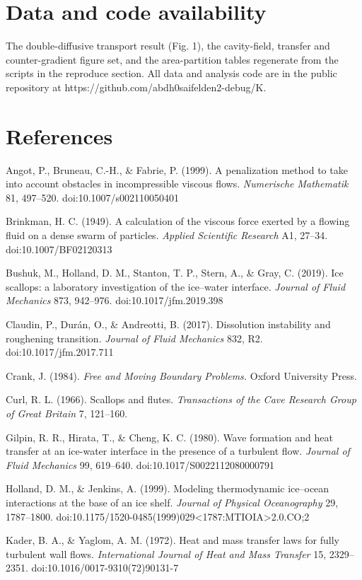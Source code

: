 \documentclass[11pt]{article}
\begin{document}
\section*{Data and code availability}


The double-diffusive transport result (Fig. 1), the cavity-field, transfer and counter-gradient figure set, and the area-partition tables regenerate from the scripts in the reproduce section. All data and analysis code are in the public repository at https://github.com/abdh0saifelden2-debug/K.


\section*{References}


Angot, P., Bruneau, C.-H., \& Fabrie, P. (1999). A penalization method to take into account obstacles in incompressible viscous flows. \emph{Numerische Mathematik} 81, 497–520. doi:10.1007/s002110050401


Brinkman, H. C. (1949). A calculation of the viscous force exerted by a flowing fluid on a dense swarm of particles. \emph{Applied Scientific Research} A1, 27–34. doi:10.1007/BF02120313


Bushuk, M., Holland, D. M., Stanton, T. P., Stern, A., \& Gray, C. (2019). Ice scallops: a laboratory investigation of the ice–water interface. \emph{Journal of Fluid Mechanics} 873, 942–976. doi:10.1017/jfm.2019.398


Claudin, P., Durán, O., \& Andreotti, B. (2017). Dissolution instability and roughening transition. \emph{Journal of Fluid Mechanics} 832, R2. doi:10.1017/jfm.2017.711


Crank, J. (1984). \emph{Free and Moving Boundary Problems.} Oxford University Press.


Curl, R. L. (1966). Scallops and flutes. \emph{Transactions of the Cave Research Group of Great Britain} 7, 121–160.


Gilpin, R. R., Hirata, T., \& Cheng, K. C. (1980). Wave formation and heat transfer at an ice-water interface in the presence of a turbulent flow. \emph{Journal of Fluid Mechanics} 99, 619–640. doi:10.1017/S0022112080000791


Holland, D. M., \& Jenkins, A. (1999). Modeling thermodynamic ice–ocean interactions at the base of an ice shelf. \emph{Journal of Physical Oceanography} 29, 1787–1800. doi:10.1175/1520-0485(1999)029<1787:MTIOIA>2.0.CO;2


Kader, B. A., \& Yaglom, A. M. (1972). Heat and mass transfer laws for fully turbulent wall flows. \emph{International Journal of Heat and Mass Transfer} 15, 2329–2351. doi:10.1016/0017-9310(72)90131-7
\end{document}
